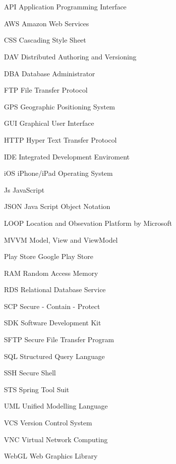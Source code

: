 \newpage
\chapter*{\abbreviationName}
\vspace{-0.3em}


\begin{abbrv}
\item[API]					Application Programming Interface
\item[AWS]					Amazon Web Services
\item[CSS]					Cascading Style Sheet
\item[DAV]					Distributed Authoring and Versioning
\item[DBA]					Database Administrator
\item[FTP]					File Transfer Protocol
\item[GPS]					Geographic Positioning System
\item[GUI]					Graphical User Interface
\item[HTTP]					Hyper Text Transfer Protocol
\item[IDE]					Integrated Development Enviroment
\item[iOS]					iPhone/iPad Operating System
\item[Js]					JavaScript
\item[JSON]					Java Script Object Notation
\item[LOOP]					Location and Obsevation Platform by Microsoft
\item[MVVM]                 Model, View and ViewModel
\item[Play Store]			Google Play Store
\item[RAM]				    Random Access Memory
\item[RDS]				    Relational Database Service
\item[SCP]                  Secure - Contain - Protect
\item[SDK]                  Software Development Kit
\item[SFTP]                 Secure File Transfer Program
\item[SQL]                  Structured Query Language
\item[SSH]                  Secure Shell
\item[STS]                  Spring Tool Suit
\item[UML]                  Unified Modelling Language
\item[VCS]					Version Control System
\item[VNC]					Virtual Network Computing
\item[WebGL]                Web Graphics Library
\end{abbrv}